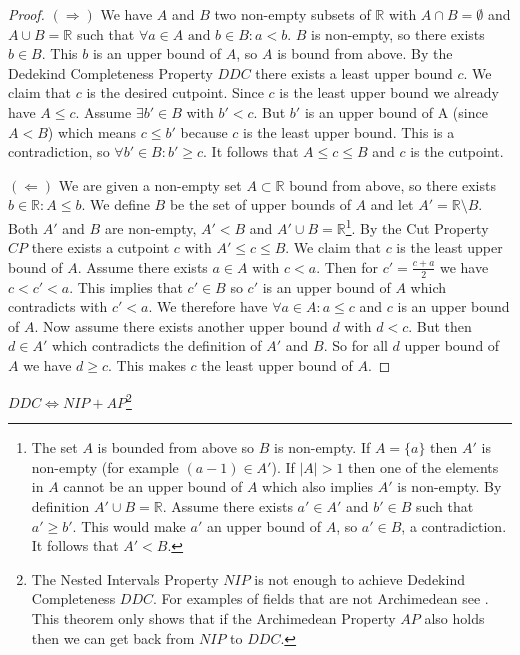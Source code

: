 \begin{proof}

\noindent$(\Rightarrow)$ We have $A$ and $B$ two non-empty subsets of $\mathbb{R}$ with $A \cap B = \emptyset$ and $A \cup B = \mathbb{R}$ such that $\forall a \in A \text{ and } b \in B: a < b$. $B$ is non-empty, so there exists $b \in B$. This $b$ is an upper bound of $A$, so $A$ is bound from above. By the Dedekind Completeness Property $DDC$ there exists a least upper bound $c$. We claim that $c$ is the desired cutpoint. Since $c$ is the least upper bound we already have $A \leq c$. Assume $\exists b' \in B$ with $b' < c$. But $b'$ is an upper bound of A (since $A < B$) which means $c \leq b'$ because $c$ is the least upper bound. This is a contradiction, so $\forall b' \in B: b' \geq c$. It follows that $A \leq c \leq B$ and $c$ is the cutpoint. 

\noindent$(\Leftarrow)$ 
We are given a non-empty set $A \subset \mathbb{R}$ bound from above, so there exists $b \in \mathbb{R}: A \leq b$.  We define $B$ be the set of upper bounds of $A$ and let $A' = \mathbb{R} \setminus B$. Both $A'$ and $B$ are non-empty, $A' < B$ and $A' \cup B = \mathbb{R}$\footnote{The set $A$ is bounded from above so $B$ is non-empty. If $A = \{a\}$ then $A'$ is non-empty (for example $(a - 1) \in A'$). If $|A| > 1$ then one of the elements in $A$ cannot be an upper bound of $A$ which also implies $A'$ is non-empty. By definition $A' \cup B = \mathbb{R}$. Assume there exists $a' \in A'$ and $b' \in B$ such that $a' \geq b'$. This would make $a'$ an upper bound of $A$, so $a' \in B$, a contradiction. It follows that $A' < B$.}. By the Cut Property $CP$ there exists a cutpoint $c$ with $A' \leq c \leq B$. We claim that $c$ is the least upper bound of $A$. Assume there exists $a \in A$ with $c < a$. Then for $c' = \frac{c + a}{2}$ we have $c < c' < a$. This implies that $c' \in B$ so $c'$ is an upper bound of $A$ which contradicts with $c' < a$. We therefore have $\forall a \in A: a \leq c$ and $c$ is an upper bound of $A$. Now assume there exists another upper bound $d$ with $d < c$. But then $d \in A'$ which contradicts the definition of $A'$ and $B$. So for all $d$ upper bound of $A$ we have $d \geq c$. This makes $c$ the least upper bound of $A$. 
\end{proof}

\begin{thm}\label{DDCeqNIP}
$DDC \Leftrightarrow NIP + AP$\footnote{The Nested Intervals Property $NIP$ is not enough to achieve Dedekind Completeness $DDC$. For examples of fields that are not Archimedean see . This theorem only shows that if the Archimedean Property $AP$ also holds then we can get back from $NIP$ to $DDC$.}
\end{thm}

